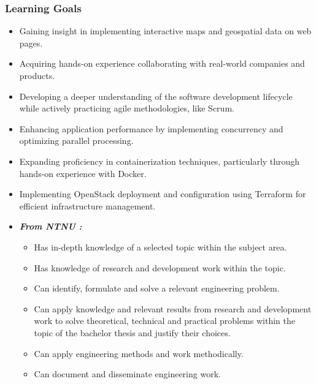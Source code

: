 \subsubsection{Learning Goals}

\begin{itemize}
    \item Gaining insight in implementing interactive maps and geospatial data on web pages.
    \item Acquiring hands-on experience collaborating with real-world companies and products.
    \item Developing a deeper understanding of the software development lifecycle while actively practicing agile methodologies, like Scrum.
    \item Enhancing application performance by implementing concurrency and optimizing parallel processing.
    \item Expanding proficiency in containerization techniques, particularly through hands-on experience with Docker.
    \item Implementing OpenStack deployment and configuration using Terraform for efficient infrastructure management.
    \item \textit{\textbf{From NTNU \cite{ntnu_idatg2900}:}}
    \begin{itemize}
        \item Has in-depth knowledge of a selected topic within the subject area.
        \item Has knowledge of research and development work within the topic.
        \item Can identify, formulate and solve a relevant engineering problem.
        \item Can apply knowledge and relevant results from research and development work to solve theoretical, technical and practical problems within the topic of the bachelor thesis and justify their choices.
        \item Can apply engineering methods and work methodically.
        \item Can document and disseminate engineering work.

\end{itemize}
\end{itemize}
